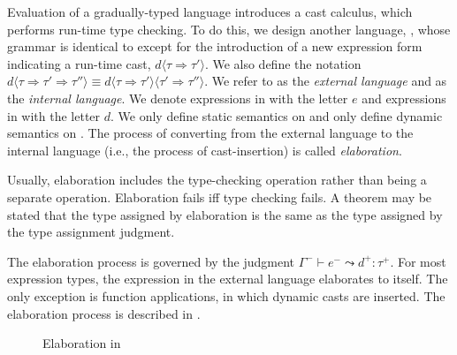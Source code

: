 Evaluation of a gradually-typed language introduces a cast calculus, which performs run-time type checking. To do this, we design another language, \gtclc{}, whose grammar is identical to \gtlc{} except for the introduction of a new expression form indicating a run-time cast, $d\langle\tau\Rightarrow\tau'\rangle$. We also define the notation $d\langle\tau\Rightarrow\tau'\Rightarrow\tau''\rangle\equiv d\langle\tau\Rightarrow\tau'\rangle\langle\tau'\Rightarrow\tau''\rangle$. We refer to \gtlc{} as the \textit{external language} and \gtclc{} as the \textit{internal language}. We denote expressions in \gtlc{} with the letter $e$ and expressions in \gtclc{} with the letter $d$. We only define static semantics on \gtlc{} and only define dynamic semantics on \gtclc{}. The process of converting from the external language to the internal language (i.e., the process of cast-insertion) is called \textit{elaboration}.

Usually, elaboration includes the type-checking operation rather than being a separate operation. Elaboration fails iff type checking fails. A theorem may be stated that the type assigned by elaboration is the same as the type assigned by the type assignment judgment.

The elaboration process is governed by the judgment $\Gamma^-\vdash e^-\leadsto d^+:\tau^+$. For most expression types, the expression in the external language elaborates to itself. The only exception is function applications, in which dynamic casts are inserted. The elaboration process is described in .

\begin{figure}
  \centering
  \begin{mdframed}
    \begin{singlespace}
    \end{singlespace}
  \end{mdframed}
  \caption{Elaboration in \gtlc}
  \label{fig:elaboration-gtlc}
\end{figure}

